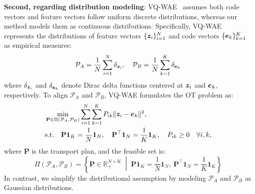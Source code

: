 \textbf{Second, regarding distribution modeling}: VQ-WAE~\cite{Vuong2023VectorQW} assumes both code vectors and feature vectors follow uniform discrete distributions, whereas our method models them as continuous distributions. Specifically, VQ-WAE~\cite{Vuong2023VectorQW} represents the distributions of feature vectors $\{\bm{z}_i\}_{i=1}^N$ and code vectors $\{\bm{e}_k\}_{k=1}^K$ as empirical measures:
\begin{align}
\label{eq:vqwae distribution}
\mathcal{P}_A = \frac{1}{N}\sum_{i=1}^{N} \delta_{\bm{z}_i}, \quad \mathcal{P}_B = \frac{1}{N}\sum_{k=1}^{K} \delta_{\bm{e}_k}
\end{align} 
where $\delta_{\bm{z}_i}$ and $\delta_{\bm{e}_k}$ denote Dirac delta functions centered at $\bm{z}_i$ and $\bm{e}_k$, respectively. To align  $\mathcal{P}_A$ and $\mathcal{P}_B$, VQ-WAE formulates the OT problem as:
\begin{equation}
\label{eq:ot_problem}
\begin{aligned}
&\min_{\mathbf{P} \in \Pi(\mathcal{P}_A, \mathcal{P}_B)} \sum_{i=1}^N \sum_{k=1}^K P_{ik} \|\bm{z}_i - \bm{e}_k\|^2, \\
&\text{s.t.} \quad \mathbf{P} \mathbf{1}_K = \frac{1}{N}\mathbf{1}_N, \quad \mathbf{P}^\top \mathbf{1}_N = \frac{1}{K}\mathbf{1}_K, \quad P_{ik} \geq 0 \quad \forall i,k,
\end{aligned}
\end{equation}
where $\mathbf{P}$ is the transport plan, and the feasible set is:
\begin{equation}
\label{eq:coupling_set}
\Pi(\mathcal{P}_A, \mathcal{P}_B) = 
\left\{ 
\mathbf{P} \in \mathbb{R}_+^{N \times K} 
\; \middle| \;
\mathbf{P} \mathbf{1}_K = \frac{1}{N} \mathbf{1}_N, \ 
\mathbf{P}^\top \mathbf{1}_N = \frac{1}{K} \mathbf{1}_K 
\right\}
\end{equation}
In contrast, we simplify the distributional assumption by modeling $\mathcal{P}_A$ and  $\mathcal{P}_B$ as Gaussian distributions.


